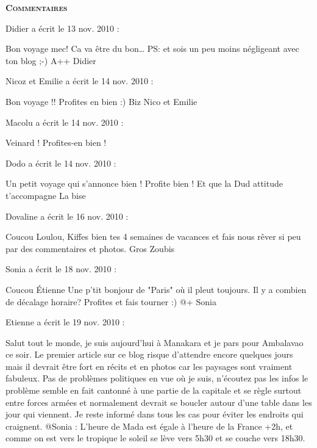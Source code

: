 \bigskip
\textbf{\textsc{Commentaires}}

\medskip
Didier a écrit le 13 nov. 2010 :
\begin{displayquote}
Bon voyage mec! Ca va être du bon\dots
PS: et sois un peu moins négligeant avec ton blog ;-)
A++
Didier
\end{displayquote}

\medskip
Nicoz et Emilie a écrit le 14 nov. 2010 :
\begin{displayquote}
Bon voyage !!
Profites en bien :)
Biz
Nico et Emilie
\end{displayquote}

\medskip
Macolu a écrit le 14 nov. 2010 :
\begin{displayquote}
Veinard ! Profites-en bien !
\end{displayquote}

\medskip
Dodo a écrit le 14 nov. 2010 :
\begin{displayquote}
Un petit voyage qui s'annonce bien ! Profite bien !
Et que la Dud attitude t'accompagne
La bise
\end{displayquote}

\medskip
Dovaline a écrit le 16 nov. 2010 :
\begin{displayquote}
Coucou Loulou,
Kiffes bien tes 4 semaines de vacances et fais nous rêver si peu par des commentaires et photos.
Gros Zoubis
\end{displayquote}

\medskip
Sonia a écrit le 18 nov. 2010 :
\begin{displayquote}
Coucou Étienne
Une p'tit bonjour de "Paris" où il pleut toujours.
Il y a combien de décalage horaire?
Profites et fais tourner :)
@+
Sonia
\end{displayquote}

\medskip
Etienne a écrit le 19 nov. 2010 :
\begin{displayquote}
Salut tout le monde, je suis aujourd'hui à Manakara et je pars pour Ambalavao ce soir. Le premier article sur ce blog risque d'attendre encore quelques jours mais il devrait être fort en récits et en photos car les paysages sont vraiment fabuleux. Pas de problèmes politiques en vue où je suis, n'écoutez pas les infos le problème semble en fait cantonné à une partie de la capitale et se règle surtout entre forces armées et normalement devrait se boucler autour d'une table dans les jour qui viennent. Je reste informé dans tous les cas pour éviter les endroits qui craignent.
@Sonia : L'heure de Mada est égale à l'heure de la France +2h, et comme on est vers le tropique le soleil se lève vers 5h30 et se couche vers 18h30.
\end{displayquote}

\vfill
